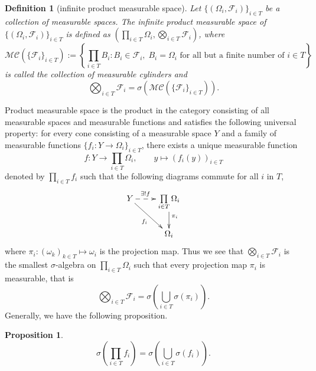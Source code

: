 \documentclass{report}
\newtheorem{definition}{Definition}[section]
\newtheorem{proposition}{Proposition}[section]
\theoremstyle{nonumberplain}
\begin{document}
\begin{definition}[infinite product measurable space]
	Let $\{(\Omega_i,\mathcal{F}_i)\}_{i\in T}$ be a collection of measurable spaces. The \emph{infinite product measurable space} of $\{(\Omega_i,\mathcal{F}_i)\}_{i\in T}$ is defined as $\left(\prod_{i\in T}\Omega_i,\bigotimes_{i\in T}\mathcal{F}_i\right)$, where
	\[
	\mathcal{MC}(\{\mathcal{F}_i\}_{i\in T}):=\left\{\prod_{i\in T}B_i:B_i\in \mathcal{F}_i,\;B_i=\Omega_i\text{ for all but a finite number of }i\in T\right\}
	\]
	is called the collection of \emph{measurable cylinders} and
	\[
	\bigotimes_{i\in T}\mathcal{F}_i=\sigma\left(\mathcal{MC}\left(\{\mathcal{F}_i\}_{i\in T}\right)\right).
	\] 
\end{definition}
Product measurable space is the product in the category consisting of all measurable spaces and measurable functions and satisfies the following universal property: for every cone consisting of a measurable space $Y$ and a family of measurable functions $\{f_i : Y \to \Omega_i\}_{i\in T}$, there exists a unique measurable function 
$$
f : Y \longrightarrow \prod_{i\in T}\Omega_i,\qquad y\longmapsto(f_i(y))_{i\in T}
$$ 
denoted by $\prod_{i\in T}f_i$ such that the following diagrams commute for all $i$ in $T$,
\[\xymatrix{
	Y\ar@{-->}[r]^{\exists!f\quad}\ar[rd]_{f_i}  &\prod\limits_{i\in T}\ar[d]^{\pi_i}\Omega_i\\
	&\Omega_i   
}\]
where $\pi_i:(\omega_k)_{k\in T}\mapsto \omega_i$ is the projection map. Thus we see that $\bigotimes_{i\in T}\mathcal{F}_i$ is the smallest $\sigma$-algebra on $\prod_{i\in T}\Omega_i$ such that every projection map $\pi_i$ is measurable, that is
\[
\bigotimes_{i\in T}\mathcal{F}_i=\sigma\left(\bigcup_{i\in T}\sigma\left(\pi_i\right)\right).
\]
Generally, we have the following proposition.
\begin{proposition}
	\[
	\sigma\left(\prod_{i\in T}f_i\right)=\sigma\left(\bigcup_{i\in T}\sigma\left(f_i\right)\right).
	\]
\end{proposition}
\end{document}
